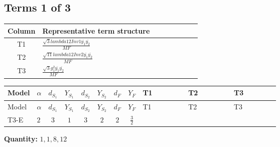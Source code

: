 \documentclass[8pt]{article}
\begin{document}
\begin{landscape}
\subsection*{Terms 1 of 3}
\begin{center}
\begin{tabular}{@{}c >{\raggedright\arraybackslash}p{0.82\linewidth}@{}}
\toprule
Column & Representative term structure \\
\midrule
T1 & \(\displaystyle \frac{\sqrt{3} lambda12Inv1 \overline{y_{1}} \overline{y_{2}}}{MF}\) \\
\midrule
T2 & \(\displaystyle \frac{\sqrt{11} lambda12Inv2 \overline{y_{1}} \overline{y_{2}}}{MF}\) \\
\midrule
T3 & \(\displaystyle \frac{\sqrt{3} g_{1}^{2} \overline{y_{1}} \overline{y_{2}}}{MF}\) \\
\midrule
\bottomrule
\end{tabular}
\end{center}
\smallskip
\tiny
\begin{longtable}{@{}llcccccc >{\raggedright\arraybackslash}p{0.21\linewidth} >{\raggedright\arraybackslash}p{0.21\linewidth} >{\raggedright\arraybackslash}p{0.21\linewidth}@{}}
\toprule
Model & $\alpha$ & $d_{S_1}$ & $Y_{S_1}$ & $d_{S_2}$ & $Y_{S_2}$ & $d_F$ & $Y_F$ & T1 & T2 & T3 \\
\midrule
\endfirsthead
\toprule
Model & $\alpha$ & $d_{S_1}$ & $Y_{S_1}$ & $d_{S_2}$ & $Y_{S_2}$ & $d_F$ & $Y_F$ & T1 & T2 & T3 \\
\midrule
\endhead
T3-E & $2$ & $3$ & $1$ & $3$ & $2$ & $2$ & $\frac{3}{2}$ & \scriptsize\adjustbox{max width=\linewidth}{$\begin{gathered} - \frac{\sqrt{3} lambda12Inv1 \overline{y_{1}} \overline{y_{2}}}{6 MF}\end{gathered}$} & \scriptsize\adjustbox{max width=\linewidth}{$\begin{gathered} \frac{3 \sqrt{11} lambda12Inv2 \overline{y_{1}} \overline{y_{2}}}{22 MF}\end{gathered}$} & \scriptsize\adjustbox{max width=\linewidth}{$\begin{gathered} \frac{9 \sqrt{3} g_{1}^{2} \overline{y_{1}} \overline{y_{2}}}{8 MF}\end{gathered}$} \\
\midrule
\bottomrule
\end{longtable}
\clearpage
\noindent\textbf{Quantity: }$\mathrm{1,1,8,12}$\par\smallskip

\end{landscape}
\end{document}
